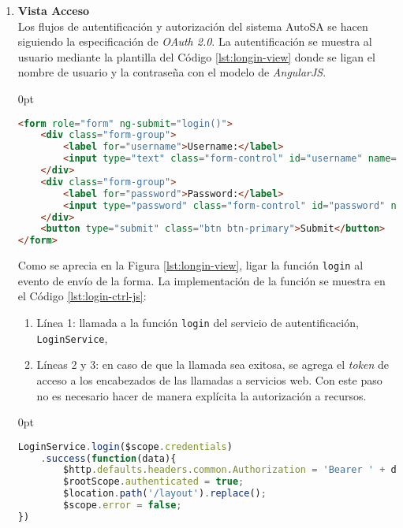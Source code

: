 \begin{enumerate}
\item \textbf{Vista Acceso}\\
Los flujos de autentificación y autorización del sistema AutoSA se hacen siguiendo la especificación de \textit{OAuth 2.0}. La autentificación se muestra al usuario mediante la plantilla del Código \ref{lst:longin-view} donde se ligan el nombre de usuario y la contraseña con el modelo de \textit{AngularJS}.
\begin{adjustwidth}{\listingfixwidth}{0pt}
\begin{lstlisting}[language=HTML, caption={Plantilla HTML de acceso.}, captionpos=b, label={lst:longin-view}]
<form role="form" ng-submit="login()">
	<div class="form-group">
		<label for="username">Username:</label>
		<input type="text" class="form-control" id="username" name="username" ng-model="credentials.username"/>
	</div>
	<div class="form-group">
		<label for="password">Password:</label>
		<input type="password" class="form-control" id="password" name="password" ng-model="credentials.password"/>
	</div>
	<button type="submit" class="btn btn-primary">Submit</button>
</form>
\end{lstlisting}
\end{adjustwidth}
Como se aprecia en la Figura \ref{lst:longin-view}, ligar la función \texttt{login} al evento de envío de la forma. La implementación de la función se muestra en el Código \ref{lst:login-ctrl-js}:
\begin{enumerate}
	\item Línea 1: llamada a la función \texttt{login} del servicio de autentificación, \texttt{LoginService},
	\item Líneas 2 y 3: en caso de que la llamada sea exitosa, se agrega el \textit{token} de acceso a los encabezados de las llamadas a servicios web. Con este paso no es necesario hacer de manera explícita la autorización a recursos.
\end{enumerate}
\begin{adjustwidth}{\listingfixwidth}{0pt}
\begin{lstlisting}[language=Javascript, caption={Petición de un \textit{token} de acceso.}, captionpos=b, label={lst:login-ctrl-js}]
LoginService.login($scope.credentials)
	.success(function(data){
		$http.defaults.headers.common.Authorization = 'Bearer ' + data.access_token;
		$rootScope.authenticated = true;
		$location.path('/layout').replace();
		$scope.error = false;
})
\end{lstlisting}
\end{adjustwidth}

\end{enumerate}
